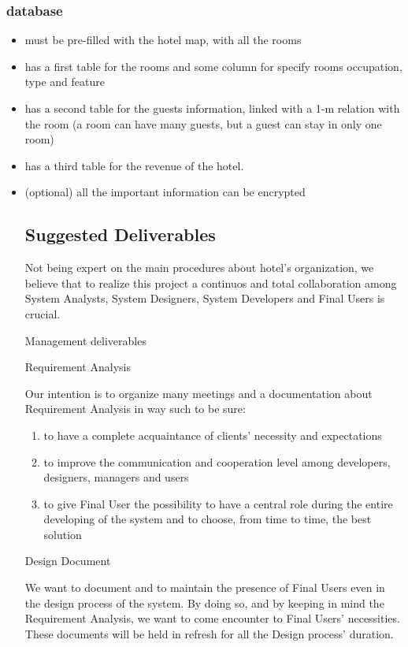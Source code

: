 \subsubsection{database}
    \begin{itemize}
	\item must be pre-filled with the hotel map, with all the rooms
	\item has a first table for the rooms and some column for specify rooms occupation, type and feature
	\item has a second table for the guests information, linked with a 1-m relation with the room (a room can have many guests, but a guest can stay in only one room)
	\item has a third table for the revenue of the hotel.
	\item (optional) all the important information can be encrypted

\subsection{Suggested Deliverables}

Not being expert on the main procedures about hotel’s organization, we believe that to realize this project a continuos and total collaboration among System Analysts, System Designers, System Developers and Final Users is crucial.


Management deliverables

Requirement Analysis 
	
	Our intention is to organize many meetings and a documentation about Requirement Analysis in way such to be sure:
\begin{enumerate}
	\item to have a complete acquaintance of clients’ necessity and expectations
	\item to improve the communication and cooperation level among developers,
	  designers, managers and users
	\item to give Final User the possibility to have a central role during the entire 
	  developing of the system and to choose, from time to time, the best solution
\end{enumerate}

Design Document
	
	We want to document and to maintain the presence of Final Users even in the design process of the system. By doing so, and by keeping in mind the Requirement Analysis, we want to come encounter to Final Users’ necessities. 
	These documents will be held in refresh for all the Design process’ duration.



\end{itemize}
